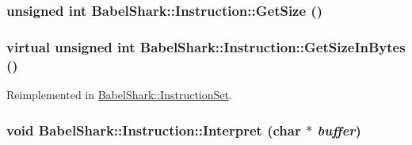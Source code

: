 \hypertarget{class_babel_shark_1_1_instruction_fe7f043dc99a5c72c8ac5e3ae23ab35a}{
\subsubsection[{GetSize}]{\setlength{\rightskip}{0pt plus 5cm}unsigned int BabelShark::Instruction::GetSize ()}}
\label{class_babel_shark_1_1_instruction_fe7f043dc99a5c72c8ac5e3ae23ab35a}


\hypertarget{class_babel_shark_1_1_instruction_4d24b597fc26a85423d9f9cf79dc9709}{
\subsubsection[{GetSizeInBytes}]{\setlength{\rightskip}{0pt plus 5cm}virtual unsigned int BabelShark::Instruction::GetSizeInBytes ()}}
\label{class_babel_shark_1_1_instruction_4d24b597fc26a85423d9f9cf79dc9709}




Reimplemented in \hyperlink{class_babel_shark_1_1_instruction_set_5f11c971baf5eba34cc825a65ab51ba9}{BabelShark::InstructionSet}.\hypertarget{class_babel_shark_1_1_instruction_bfbceb493d151b2e255c7c8cbac7a476}{
\subsubsection[{Interpret}]{\setlength{\rightskip}{0pt plus 5cm}void BabelShark::Instruction::Interpret (char $\ast$ {\em buffer})}}
\label{class_babel_shark_1_1_instruction_bfbceb493d151b2e255c7c8cbac7a476}




